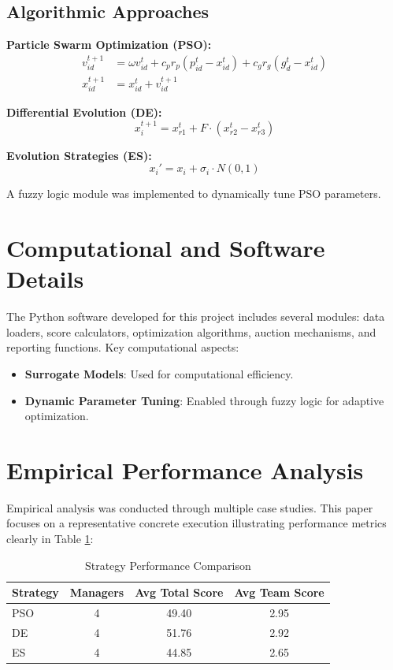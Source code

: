 \documentclass[sigconf]{acmart}
\begin{document}
	\subsection{Algorithmic Approaches}
	
	\textbf{Particle Swarm Optimization (PSO):} 
	\begin{align}
		v_{id}^{t+1} &= \omega v_{id}^{t} + c_{p} r_{p} (p_{id}^{t} - x_{id}^{t}) + c_{g} r_{g} (g_{d}^{t} - x_{id}^{t}) \\
		x_{id}^{t+1} &= x_{id}^{t} + v_{id}^{t+1}
	\end{align}
	
	\textbf{Differential Evolution (DE):}
	\begin{equation}
		x_{i}^{t+1} = x_{r1}^{t} + F \cdot (x_{r2}^{t} - x_{r3}^{t})
	\end{equation}
	
	\textbf{Evolution Strategies (ES):}
	\begin{equation}
		x_i' = x_i + \sigma_i \cdot N(0,1)
	\end{equation}
	
	A fuzzy logic module was implemented to dynamically tune PSO parameters.
	
	\section{Computational and Software Details}
	The Python software developed for this project includes several modules: data loaders, score calculators, optimization algorithms, auction mechanisms, and reporting functions. Key computational aspects:
	\begin{itemize}
		\item \textbf{Surrogate Models}: Used for computational efficiency.
		\item \textbf{Dynamic Parameter Tuning}: Enabled through fuzzy logic for adaptive optimization.
	\end{itemize}
	
	\section{Empirical Performance Analysis}
	Empirical analysis was conducted through multiple case studies. This paper focuses on a representative concrete execution illustrating performance metrics clearly in Table \ref{tab:performance}:
	
	\begin{table}[H]
		\centering
		\begin{tabular}{lccc}
			\toprule
			Strategy & Managers & Avg Total Score & Avg Team Score \\
			\midrule
			PSO & 4 & 49.40 & 2.95 \\
			DE & 4 & 51.76 & 2.92 \\
			ES & 4 & 44.85 & 2.65 \\
			\bottomrule
		\end{tabular}
		\caption{Strategy Performance Comparison}
		\label{tab:performance}
	\end{table}
	
\end{document}
